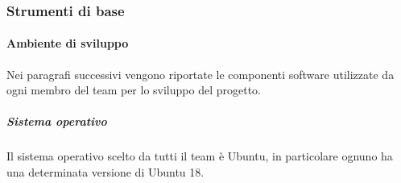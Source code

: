         \subsubsection{Strumenti di base}\label{PP:Sviluppo:Strumenti}

	    \paragraph{Ambiente di sviluppo}\label{PP:Sviluppo:Strumenti:AmbienteSviluppo}
	    Nei paragrafi successivi vengono riportate le componenti software utilizzate da ogni membro del team per lo sviluppo del progetto.


	    \subparagraph{Sistema operativo}\label{PP:Sviluppo:Strumenti:AmbienteSviluppo:SistemaOperativo}
	    Il sistema operativo scelto da tutti il team è Ubuntu, in particolare ognuno ha una determinata versione di Ubuntu 18.

